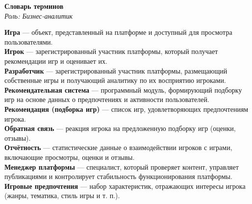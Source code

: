 \documentclass[a4paper,12pt]{article}
\begin{document}
\begin{center}
    {\Large \textbf{Словарь терминов}}\\[5pt]
    \textit{Роль: Бизнес-аналитик}\\[10pt]
\end{center}

\noindent\textbf{Игра} — объект, представленный на платформе и доступный для просмотра пользователями.\\[6pt]
\textbf{Игрок} — зарегистрированный участник платформы, который получает рекомендации игр и оценивает их.\\[6pt]
\textbf{Разработчик} — зарегистрированный участник платформы, размещающий собственные игры и получающий аналитику по их восприятию игроками.\\[6pt]
\textbf{Рекомендательная система} — программный модуль, формирующий подборку игр на основе данных о предпочтениях и активности пользователей.\\[6pt]
\textbf{Рекомендация (подборка игр)} — список игр, удовлетворяющих предпочтениям игрока.\\[6pt]
\textbf{Обратная связь} — реакция игрока на предложенную подборку игр (оценки, отзывы).\\[6pt]
\textbf{Отчётность} — статистические данные о взаимодействии игроков с играми, включающие просмотры, оценки и отзывы.\\[6pt]
\textbf{Менеджер платформы} — специалист, который проверяет контент, управляет публикациями и контролирует стабильность функционирования платформы.\\[6pt]
\textbf{Игровые предпочтения} — набор характеристик, отражающих интересы игрока (жанры, тематика, стиль игры и т. п.).
\end{document}
